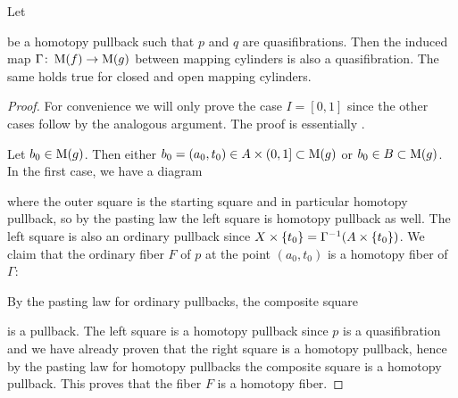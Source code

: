 \begin{lemma}\label{lem:mapOfCylIsQuasiFib}
    Let 
    \begin{center}
    \end{center}
    be a homotopy pullback such that $p$ and $q$ are quasifibrations.
    Then the induced map $\Gamma\colon\operatorname{M}(f)\to\operatorname{M}(g)$ between mapping cylinders is also a quasifibration.
    The same holds true for closed and open mapping cylinders.
    \begin{proof}
        For convenience we will only prove the case $I=[0,1]$ since the other cases follow by the analogous argument.
        The proof is essentially \cite[Lemma 5.10.6]{cubical_htpy_theory}.

        Let $b_0\in\operatorname{M}(g)$. 
        Then either $b_0=(a_0,t_0)\in A\times(0,1]\subset\operatorname{M}(g)$ or $b_0\in B\subset\operatorname{M}(g)$.
        In the first case, we have a diagram
        \begin{center}
        \end{center}
        where the outer square is the starting square and in particular homotopy pullback, so by the pasting law the left square is homotopy pullback as well.
        The left square is also an ordinary pullback since $X\times\left\lbrace t_0\right\rbrace=\Gamma^{-1}(A\times\left\lbrace t_0\right\rbrace)$.
        We claim that the ordinary fiber $F$ of $p$ at the point $(a_0,t_0)$ is a homotopy fiber of $\Gamma$:
        
        By the pasting law for ordinary pullbacks, the composite square
        \begin{center}
        \end{center}
        is a pullback. 
        The left square is a homotopy pullback since $p$ is a quasifibration and we have already proven that the right square is a homotopy pullback, hence by the pasting law for homotopy pullbacks the composite square is a homotopy pullback. 
        This proves that the fiber $F$ is a homotopy fiber.


\end{proof}
\end{lemma}

